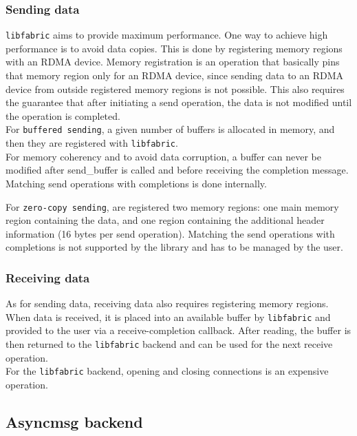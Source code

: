 \subsubsection{Sending data}

\texttt{libfabric} aims to provide maximum performance. One way to achieve high performance is to avoid data copies. This is done by registering memory regions with an \acs{RDMA} device. Memory registration is an operation that basically pins that memory region only for an \acs{RDMA} device, since sending data to an \acs{RDMA} device from outside registered memory regions is not possible. This also requires the guarantee that after initiating a send operation, the data is not modified until the operation is completed.\\

For \texttt{buffered sending}, a given number of buffers is allocated in memory, and then they are registered with \texttt{libfabric}.\\
For memory coherency and to avoid data corruption, a buffer can never be modified after send\_buffer is called and before receiving the completion message. Matching send operations with completions is done internally.

For \texttt{zero-copy sending}, are registered two memory regions: one main memory region containing the data, and one region containing the additional header information (16 bytes per send operation).  Matching the send operations with completions is not supported by the library and has to be managed by the user.

\subsubsection{Receiving data}

As for sending data, receiving data also requires registering memory regions. When data is received, it is placed into an available buffer by \texttt{libfabric} and provided to the user via a receive-completion callback. After reading, the buffer is then returned to the \texttt{libfabric} backend and can be used for the next receive operation.\\
For the \texttt{libfabric} backend, opening and closing connections is an expensive operation.

\subsection{Asyncmsg backend}
\label{subsec:asyncmsg}

